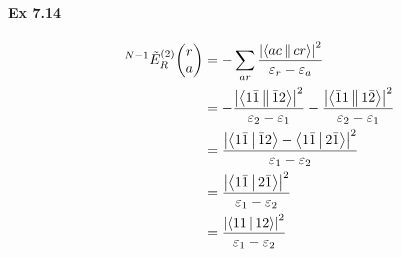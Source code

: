 \documentclass[a4paper]{article}
\newcommand{\ex}[1]{\paragraph{Ex #1}}
\numberwithin{equation}{subsection}
\begin{document}
\ex{7.14}
\begin{align}
{^{N-1}}\tilde{E}_R^{(2)}\mqty(r\\ a) &= -\sum_{ar}\dfrac{\abs{\Braket{ac||cr}}^2}{\varepsilon_r - \varepsilon_a} \notag\\
&= -\dfrac{\abs{\Braket{1\bar{1}||\bar{1}2}}^2}{\varepsilon_2 - \varepsilon_1} - \dfrac{\abs{\Braket{\bar{1} 1||1\bar{2}}}^2}{\varepsilon_2 - \varepsilon_1} \notag\\
&= \dfrac{\abs{\Braket{1\bar{1}|\bar{1}2} - \Braket{1\bar{1}|2\bar{1}}}^2}{\varepsilon_1 - \varepsilon_2} \notag\\
&= \dfrac{\abs{\Braket{1\bar{1}|2\bar{1}}}^2}{\varepsilon_1 - \varepsilon_2} \notag\\
&= \dfrac{\abs{\Braket{11|12}}^2}{\varepsilon_1 - \varepsilon_2} 
\end{align}
\end{document}
